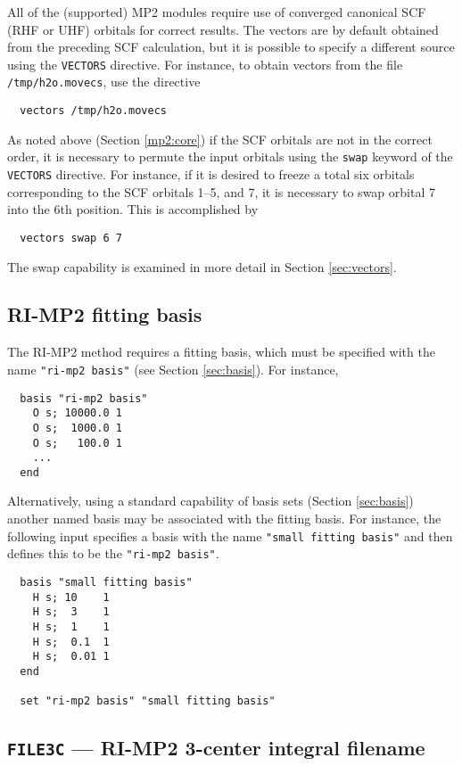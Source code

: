 All of the (supported) MP2 modules require use of converged canonical
SCF (RHF or UHF) orbitals for correct results.  The vectors are by
default obtained from the preceding SCF calculation, but it is
possible to specify a different source using the \verb+VECTORS+
directive.  For instance, to obtain vectors from the file
\verb+/tmp/h2o.movecs+, use the directive
\begin{verbatim}
  vectors /tmp/h2o.movecs
\end{verbatim}

As noted above (Section \ref{mp2:core}) if the SCF orbitals are not in
the correct order, it is necessary to permute the input orbitals using
the \verb+swap+ keyword of the \verb+VECTORS+ directive.  For
instance, if it is desired to freeze a total six orbitals
corresponding to the SCF orbitals 1--5, and 7, it is necessary to swap
orbital 7 into the 6th position.  This is accomplished by
\begin{verbatim}
  vectors swap 6 7
\end{verbatim}
The swap capability is examined in more detail in Section
\ref{sec:vectors}.


\subsection{RI-MP2 fitting basis}

\sloppy

The RI-MP2 method requires a fitting basis, which must be specified
with the name \verb+"ri-mp2 basis"+ (see Section \ref{sec:basis}).
For instance,
\begin{verbatim}
  basis "ri-mp2 basis"
    O s; 10000.0 1
    O s;  1000.0 1
    O s;   100.0 1
    ...
  end
\end{verbatim}

Alternatively, using a standard capability of basis sets (Section
\ref{sec:basis}) another named basis may be associated with the
fitting basis.  For instance, the following input specifies a basis
with the name \verb+"small fitting basis"+ and then defines this to be
the \verb+"ri-mp2 basis"+.
\begin{verbatim}
  basis "small fitting basis"
    H s; 10    1
    H s;  3    1
    H s;  1    1
    H s;  0.1  1
    H s;  0.01 1
  end

  set "ri-mp2 basis" "small fitting basis"
\end{verbatim}

\fussy


\subsection{{\tt FILE3C} --- RI-MP2 3-center integral filename}

